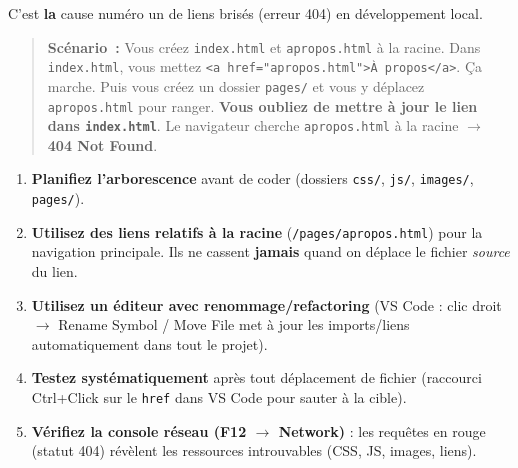 \documentclass[11pt]{article}
\begin{document}
\begin{attention}
C'est \textbf{la} cause numéro un de liens brisés (erreur 404) en développement local.
\begin{quote}
\textbf{Scénario~:} Vous créez \texttt{index.html} et \texttt{apropos.html} à la racine. Dans \texttt{index.html}, vous mettez \texttt{<a href="apropos.html">À propos</a>}. Ça marche. Puis vous créez un dossier \texttt{pages/} et vous y déplacez \texttt{apropos.html} pour ranger. \textbf{Vous oubliez de mettre à jour le lien dans \texttt{index.html}}. Le navigateur cherche \texttt{apropos.html} à la racine $\to$ \textbf{404 Not Found}.
\end{quote}
\begin{methode}
\begin{enumerate}
    \item \textbf{Planifiez l'arborescence} avant de coder (dossiers \texttt{css/}, \texttt{js/}, \texttt{images/}, \texttt{pages/}).
    \item \textbf{Utilisez des liens relatifs à la racine} (\texttt{/pages/apropos.html}) pour la navigation principale. Ils ne cassent \textbf{jamais} quand on déplace le fichier \emph{source} du lien.
    \item \textbf{Utilisez un éditeur avec renommage/refactoring} (VS Code : clic droit $\to$ Rename Symbol / Move File met à jour les imports/liens automatiquement dans tout le projet).
    \item \textbf{Testez systématiquement} après tout déplacement de fichier (raccourci Ctrl+Click sur le \texttt{href} dans VS Code pour sauter à la cible).
    \item \textbf{Vérifiez la console réseau (F12 $\to$ Network)} : les requêtes en rouge (statut 404) révèlent les ressources introuvables (CSS, JS, images, liens).
\end{enumerate}
\end{methode}
\end{attention}
\end{document}

